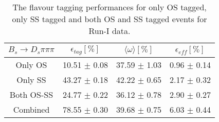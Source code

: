 \begin{table}[h]
\centering
\caption{The flavour tagging performances for only OS tagged, only SS tagged and both OS and SS tagged events for Run-I data.}
\begin{tabular}{c c c c}
\hline
\hline
$ B_s \to D_s \pi \pi \pi$ & $\epsilon_{tag} [\%]$ & $\langle \omega \rangle [\%] $ & $\epsilon_{eff} [\%]$ \\
\hline
Only OS & 10.51 $\pm$ 0.08 & 37.59 $\pm$ 1.03 & 0.96 $\pm$ 0.14\\
Only SS & 43.27 $\pm$ 0.18 & 42.22 $\pm$ 0.65 & 2.17 $\pm$ 0.32\\
Both OS-SS & 24.77 $\pm$ 0.22 & 36.12 $\pm$ 0.78 & 2.90 $\pm$ 0.27\\
\hline
Combined & 78.55 $\pm$ 0.30 & 39.68 $\pm$ 0.75 & 6.03 $\pm$ 0.44\\
\hline
\hline
\end{tabular}
\label{table:tagging_Run1}
\end{table}